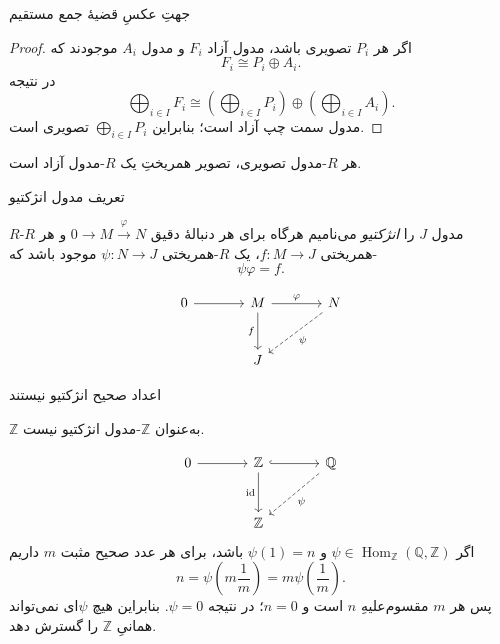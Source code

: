 \begin{frame}[t]{جهتِ عکسِ قضیهٔ جمع مستقیم}
\label{lec17:projective-direct-sum-converse}
\begin{proof}
اگر هر $P_i$ تصویری باشد، مدول آزاد $F_i$ و مدول $A_i$ موجودند که
\[
F_i\cong P_i\oplus A_i.
\]
در نتیجه
\[
\bigoplus_{i\in I}F_i
\cong\left(\bigoplus_{i\in I}P_i\right)
\oplus\left(\bigoplus_{i\in I}A_i\right).
\]
مدول سمت چپ آزاد است؛ بنابراین $\bigoplus_{i\in I}P_i$ تصویری است.
\end{proof}
\begin{remark}
هر $R$-مدول تصویری، تصویر همریختِ یک $R$-مدول آزاد است.
\end{remark}
\end{frame}

\begin{frame}[t]{تعریف مدول انژکتیو}
\label{lec17:injective-definition}
\begin{definition}
$R$-مدول $J$ را \textit{انژکتیو} می‌نامیم هرگاه برای هر دنبالهٔ دقیق
$0\to M\xrightarrow{\varphi}N$ و هر $R$-همریختی $f:M\to J$،
یک $R$-همریختی $\psi:N\to J$ موجود باشد که
\[
\psi\varphi=f.
\]
\end{definition}
\[
\begin{tikzcd}[ampersand replacement=\&,column sep=large,row sep=large]
0\arrow[r]\&M\arrow[r,"\varphi"]\arrow[d,"f"']\&N\arrow[dl,dashed,"\psi"]\\
\&J\&
\end{tikzcd}
\]
\end{frame}

\begin{frame}[t]{اعداد صحیح انژکتیو نیستند}
\label{lec17:integers-not-injective}
\begin{example}
$\mathbb Z$ به‌عنوان $\mathbb Z$-مدول انژکتیو نیست.
\end{example}
\[
\begin{tikzcd}[ampersand replacement=\&,column sep=large,row sep=large]
0\arrow[r]\&\mathbb Z\arrow[r,hook]\arrow[d,"\operatorname{id}"']
\&\mathbb Q\arrow[dl,dashed,"\psi"]\\
\&\mathbb Z\&
\end{tikzcd}
\]
اگر $\psi\in\operatorname{Hom}_{\mathbb Z}(\mathbb Q,\mathbb Z)$ و
$\psi(1)=n$ باشد، برای هر عدد صحیح مثبت $m$ داریم
\[
n=\psi\!\left(m\frac1m\right)=m\psi\!\left(\frac1m\right).
\]
پس هر $m$ مقسوم‌علیهِ $n$ است و $n=0$؛ در نتیجه $\psi=0$.
بنابراین هیچ $\psi$ای نمی‌تواند همانیِ $\mathbb Z$ را گسترش دهد.
\end{frame}

